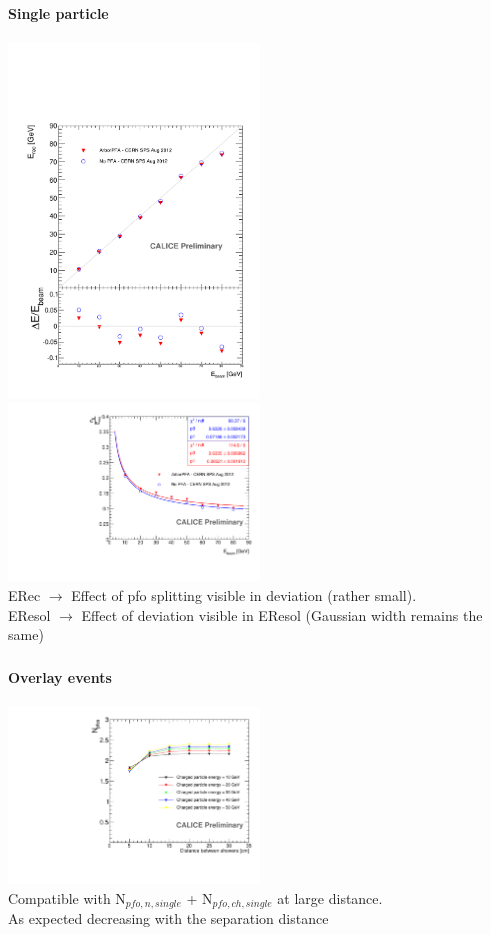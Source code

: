 \documentclass[8pt]{beamer}
\begin{document}
  
  \begin{frame}
  \frametitle{\secname}
  \framesubtitle{Single particle}
    \begin{center}
      \includegraphics[width=0.5\textwidth]{plots/SingleParticle_ERec.pdf}
      \includegraphics[width=0.5\textwidth]{plots/SingleParticle_EResol.pdf} \\
      ERec $\rightarrow$ Effect of pfo splitting visible in deviation (rather small). \\
      EResol $\rightarrow$ Effect of deviation visible in EResol (Gaussian width remains the same)
    \end{center}    
  \end{frame}
  
  
  \begin{frame}
  \frametitle{\secname}
  \framesubtitle{Overlay events}
    \begin{center}
      \includegraphics[width=0.5\textwidth]{plots/OverlayEvent_NPfos.pdf} \\
      Compatible with N$_{pfo,n,single}$ + N$_{pfo,ch,single}$ at large distance. \\
      As expected decreasing with the separation distance
    \end{center}
  \end{frame}
  
\end{document}
